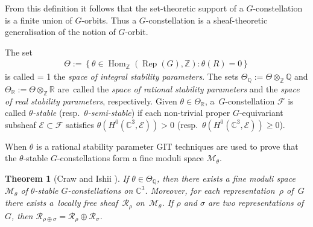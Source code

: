 \documentclass[pdftex]{sigma}
\numberwithin{equation}{section}
\newcommand{\sE}{\mathscr{E}}
\newcommand{\sF}{\mathscr{F}}
\newcommand{\sM}{\mathscr{M}}
\newcommand{\sR}{\mathscr{R}}
\newcommand{\Z}{{\mathbb Z}}
\newcommand{\Q}{{\mathbb Q}}
\newcommand{\R}{{\mathbb R}}
\newcommand{\C}{{\mathbb C}}
\newcommand{\Hom}{\operatorname{Hom}}
\newcommand{\Rep}{\operatorname{Rep}}
\newtheorem{Theorem}{Theorem}[section]
\begin{document}
From this def\/inition it follows that the set-theoretic support of a $G$-constellation is a f\/inite union of $G$-orbits.
Thus a $G$-constellation is a sheaf-theoretic generalisation of the notion of $G$-orbit.

\begin{Definition}\label{Def_Theta}
  The set
  \begin{gather*}
    \Theta := \left\{ \theta\in\Hom_\Z(\Rep(G),\Z)\colon
                      \theta(R)=0 \right\}
  \end{gather*}
  is called \looseness= 1 the \emph{space of integral stability parameters}.  The
  sets $\Theta_\Q := \Theta \otimes_\Z \Q$ and $\Theta_\R := \Theta
  \otimes_\Z \R$ are~cal\-led the \emph{space of rational stability
    parameters} and the \emph{space of real stability parameters},
  respectively.  Given $\theta \in \Theta_\R$, a~$G$-constellation
  $\sF$ is called \emph{$\theta$-stable}
  (resp.\ \emph{$\theta$-semi-stable}) if each non-tri\-vial proper
  $G$-equivariant subsheaf $\sE\subset\sF$ satisf\/ies
  $\theta(H^0(\C^3, \sE))>0$ (resp.\ $\theta(H^0(\C^3, \sE))\geq
  0$).
\end{Definition}


When $\theta$ is a rational stability parameter GIT techniques are
used to prove that the $\theta$-stable $G$-constellations form a f\/ine
moduli space $\sM_{\theta}$.

\begin{Theorem}[Craw and Ishii ]\label{thm:ci21}
  If $\theta\in\Theta_\Q$, then there exists a fine moduli
  spa\-ce~$\sM_\theta$ of $\theta$-stable $G$-constellations on
  $\C^3$.  Moreover, for each representation~$\rho$ of~$G$ there
  exists a~locally free sheaf~$\sR_\rho$ on~$\sM_\theta$. If $\rho$
  and $\sigma$ are two representations of~$G$, then
  $\sR_{\rho\oplus\sigma}=\sR_\rho\oplus\sR_\sigma$.
\end{Theorem}
\end{document}
